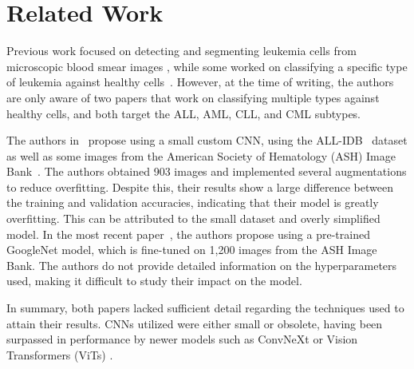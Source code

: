 \section{Related Work}
Previous work focused on detecting and segmenting leukemia cells from microscopic blood smear images \cite{dhal2020acute,genovese2021acute,das2021transfer,mohapatra2012lymphocyte}, while some worked on classifying a specific type of leukemia against healthy cells~\cite{jothi2019rough, shah2019classification, negm2018decision, rawat2017computer}. However, at the time of writing, the authors are only aware of two papers that work on classifying multiple types against healthy cells, and both target the ALL, AML, CLL, and CML subtypes.

The authors in~\cite{ahmed2019identification} propose using a small custom CNN, using the ALL-IDB~\cite{6115881} dataset as well as some images from the American Society of Hematology (ASH) Image Bank~\cite{imagebank}. The authors obtained 903 images and implemented several augmentations to reduce overfitting. Despite this, their results show a large difference between the training and validation accuracies, indicating that their model is greatly overfitting. This can be attributed to the small dataset and overly simplified model. In the most recent paper~\cite{9425264}, the authors propose using a pre-trained GoogleNet model, which is fine-tuned on 1,200 images from the ASH Image Bank. The authors do not provide detailed information on the hyperparameters used, making it difficult to study their impact on the model.

In summary, both papers lacked sufficient detail regarding the techniques used to attain their results. %
CNNs utilized were either small or obsolete, having been surpassed in performance by newer models such as ConvNeXt \cite{liu2022convnet} or Vision Transformers (ViTs) \cite{dosovitskiy2020image}.

